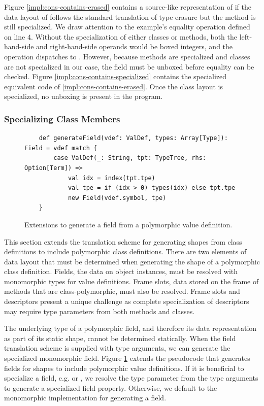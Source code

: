 Figure \ref{impl:cons-contains-erased} contains a source-like representation of  if the data layout of  follows the standard translation of type erasure but the method is still specialized.
We draw attention to the example's equality operation defined on line $4$.
Without the specialization of either classes or methods, both the left-hand-side and right-hand-side operands would be boxed integers, and the \scalainline{==} operation dispatches to .
However, because methods are specialized and classes are not specialized in our case, the  field must be unboxed before equality can be checked.
Figure \ref{impl:cons-contains-specialized} contains the specialized equivalent code of \ref{impl:cons-contains-erased}.
Once the class layout is specialized, no unboxing is present in the program.

\subsubsection*{Specializing Class Members}

\begin{figure}[!htb]
	\begin{verbatim}
	def generateField(vdef: ValDef, types: Array[Type]): Field = vdef match {
		case ValDef(_: String, tpt: TypeTree, rhs: Option[Term]) => 
			val idx = index(tpt.tpe)
			val tpe = if (idx > 0) types(idx) else tpt.tpe
			new Field(vdef.symbol, tpe)
	}
	\end{verbatim}
	\caption{Extensions to generate a field from a polymorphic value definition.}
	\label{impl:generate-poly-field}
\end{figure}

This section extends the translation scheme for generating shapes from class definitions to include polymorphic class definitions.
There are two elements of data layout that must be determined when generating the shape of a polymorphic class definition.
Fields, the data on object instances, must be resolved with monomorphic types for value definitions.
Frame slots, data stored on the frame of methods that are class-polymorphic, must also be resolved.
Frame slots and descriptors present a unique challenge as complete specialization of descriptors may require type parameters from both methods and classes.

The underlying type of a polymorphic field, and therefore its data representation as part of its static shape, cannot be determined statically.
When the field translation scheme is supplied with type arguments, we can generate the specialized monomorphic field.
Figure \ref{impl:generate-poly-field} extends the pseudocode that generates fields for shapes to include polymorphic value definitions.
If it is beneficial to specialize a field, e.g.  or , we resolve the type parameter from the type arguments to generate a specialized field property.
Otherwise, we default to the monomorphic implementation for generating a field.

